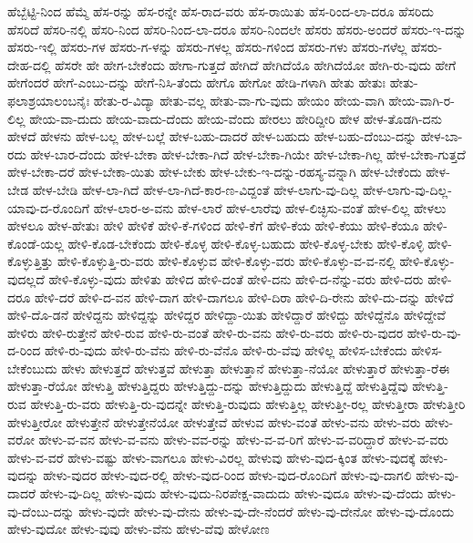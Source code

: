 {ಹೆಬ್ಬೆಟ್ಟಿ-ನಿಂದ
ಹೆಮ್ಮೆ
ಹೆಸ-ರನ್ನು
ಹೆಸ-ರನ್ನೇ
ಹೆಸ-ರಾದ-ವರು
ಹೆಸ-ರಾಯಿತು
ಹೆಸ-ರಿಂದ-ಲಾ-ದರೂ
ಹೆಸರಿದು
ಹೆಸರಿದೆ
ಹೆಸರಿ-ನಲ್ಲಿ
ಹೆಸರಿ-ನಿಂದ
ಹೆಸರಿ-ನಿಂದ-ಲಾ-ದರೂ
ಹೆಸರಿ-ನಿಂದಲೇ
ಹೆಸರು
ಹೆಸರು-ಅಂದರೆ
ಹೆಸರು-ಇ-ದನ್ನು
ಹೆಸರು-ಇಲ್ಲಿ
ಹೆಸರು-ಗಳ
ಹೆಸರು-ಗ-ಳನ್ನು
ಹೆಸರು-ಗಳಲ್ಲ
ಹೆಸರು-ಗಳಿಂದ
ಹೆಸರು-ಗಳು
ಹೆಸರು-ಗಳೆಲ್ಲ
ಹೆಸರು-ದೇಹ-ದಲ್ಲಿ
ಹೆಸರೇ
ಹೇ
ಹೇಗ-ಬೇಕೆಂದು
ಹೇಗಾ-ಗುತ್ತದೆ
ಹೇಗಿದೆ
ಹೇಗಿದೆಯೊ
ಹೇಗಿದೆಯೋ
ಹೇಗಿ-ರು-ವುದು
ಹೇಗೆ
ಹೇಗೆಂದರೆ
ಹೇಗೆ-ಎಂಬು-ದನ್ನು
ಹೇಗೆ-ನಿಸಿ-ತೆಂದು
ಹೇಗೊ
ಹೇಗೋ
ಹೇಡಿ-ಗಳಾಗಿ
ಹೇತು
ಹೇತುಃ
ಹೇತು-ಫಲಾಶ್ರಯಾಲಂಬನೈಃ
ಹೇತು-ರ-ವಿದ್ಯಾ
ಹೇತು-ವಲ್ಲ
ಹೇತು-ವಾ-ಗು-ವುದು
ಹೇಯಂ
ಹೇಯ-ವಾಗಿ
ಹೇಯ-ವಾಗಿ-ರ-ಲಿಲ್ಲ
ಹೇಯ-ವಾ-ದುದು
ಹೇಯ-ವಾದು-ದೆಂದು
ಹೇಯ-ವೆಂದು
ಹೇರಲು
ಹೇರಿದ್ದೀರಿ
ಹೇಳ
ಹೇಳ-ತೊಡಗಿ-ದನು
ಹೇಳದೆ
ಹೇಳನು
ಹೇಳ-ಬಲ್ಲ
ಹೇಳ-ಬಲ್ಲೆ
ಹೇಳ-ಬಹು-ದಾದರೆ
ಹೇಳ-ಬಹುದು
ಹೇಳ-ಬಹು-ದೆಂಬು-ದನ್ನು
ಹೇಳ-ಬಾ-ರದು
ಹೇಳ-ಬಾರ-ದೆಂದು
ಹೇಳ-ಬೇಕಾ
ಹೇಳ-ಬೇಕಾ-ಗಿದೆ
ಹೇಳ-ಬೇಕಾ-ಗಿಯೇ
ಹೇಳ-ಬೇಕಾ-ಗಿಲ್ಲ
ಹೇಳ-ಬೇಕಾ-ಗುತ್ತದೆ
ಹೇಳ-ಬೇಕಾ-ದರೆ
ಹೇಳ-ಬೇಕಾ-ಯಿತು
ಹೇಳ-ಬೇಕು
ಹೇಳ-ಬೇಕು-ಇ-ದನ್ನು-ರಹಸ್ಯ-ವನ್ನಾಗಿ
ಹೇಳ-ಬೇಕೆಂದು
ಹೇಳ-ಬೇಡ
ಹೇಳ-ಬೇಡಿ
ಹೇಳ-ಲಾ-ಗಿದೆ
ಹೇಳ-ಲಾ-ಗಿದೆ-ಕಾರ-ಣ-ವಿದ್ದಂತೆ
ಹೇಳ-ಲಾಗು-ವು-ದಿಲ್ಲ
ಹೇಳ-ಲಾಗು-ವು-ದಿಲ್ಲ-ಯಾವು-ದ-ರೊಂದಿಗೆ
ಹೇಳ-ಲಾರ-ಅ-ವನು
ಹೇಳ-ಲಾರೆ
ಹೇಳ-ಲಾರೆವು
ಹೇಳ-ಲಿಚ್ಛಿಸು-ವಂತೆ
ಹೇಳ-ಲಿಲ್ಲ
ಹೇಳಲು
ಹೇಳಲೂ
ಹೇಳ-ಹೇತುಃ
ಹೇಳಿ
ಹೇಳಿಕೆ
ಹೇಳಿ-ಕೆ-ಗಳಿಂದ
ಹೇಳಿ-ಕೆಗೆ
ಹೇಳಿ-ಕೆಯ
ಹೇಳಿ-ಕೆಯು
ಹೇಳಿ-ಕೆಯೂ
ಹೇಳಿ-ಕೊಂಡೆ-ಯಲ್ಲ
ಹೇಳಿ-ಕೊಡ-ಬೇಕೆಂದು
ಹೇಳಿ-ಕೊಳ್ಳ
ಹೇಳಿ-ಕೊಳ್ಳ-ಬಹುದು
ಹೇಳಿ-ಕೊಳ್ಳ-ಬೇಕು
ಹೇಳಿ-ಕೊಳ್ಳಿ
ಹೇಳಿ-ಕೊಳ್ಳುತ್ತಿತ್ತು
ಹೇಳಿ-ಕೊಳ್ಳುತ್ತಿ-ರು-ವರು
ಹೇಳಿ-ಕೊಳ್ಳುವ
ಹೇಳಿ-ಕೊಳ್ಳು-ವರು
ಹೇಳಿ-ಕೊಳ್ಳು-ವ-ವ-ನಲ್ಲಿ
ಹೇಳಿ-ಕೊಳ್ಳು-ವುದಲ್ಲದೆ
ಹೇಳಿ-ಕೊಳ್ಳು-ವುದು
ಹೇಳಿತು
ಹೇಳಿದ
ಹೇಳಿ-ದಂತೆ
ಹೇಳಿ-ದನು
ಹೇಳಿ-ದ-ನೆನ್ನು-ವರು
ಹೇಳಿ-ದರು
ಹೇಳಿ-ದರೂ
ಹೇಳಿ-ದರೆ
ಹೇಳಿ-ದ-ವನ
ಹೇಳಿ-ದಾಗ
ಹೇಳಿ-ದಾಗಲೂ
ಹೇಳಿ-ದಿರಾ
ಹೇಳಿ-ದಿ-ರೇನು
ಹೇಳಿ-ದು-ದನ್ನು
ಹೇಳಿದೆ
ಹೇಳಿ-ದೊ-ಡನೆ
ಹೇಳಿದ್ದನು
ಹೇಳಿದ್ದನ್ನು
ಹೇಳಿದ್ದರ
ಹೇಳಿದ್ದಾ-ಯಿತು
ಹೇಳಿದ್ದಾರೆ
ಹೇಳಿದ್ದು
ಹೇಳಿದ್ದೆನೊ
ಹೇಳಿದ್ದೇವೆ
ಹೇಳಿರು
ಹೇಳಿ-ರುತ್ತೇನೆ
ಹೇಳಿ-ರುವ
ಹೇಳಿ-ರು-ವಂತೆ
ಹೇಳಿ-ರು-ವನು
ಹೇಳಿ-ರು-ವರು
ಹೇಳಿ-ರು-ವುದರ
ಹೇಳಿ-ರು-ವು-ದ-ರಿಂದ
ಹೇಳಿ-ರು-ವುದು
ಹೇಳಿ-ರು-ವೆನು
ಹೇಳಿ-ರು-ವೆನೊ
ಹೇಳಿ-ರು-ವೆವು
ಹೇಳಿಲ್ಲ
ಹೇಳಿಸ-ಬೇಕೆಂದು
ಹೇಳಿಸ-ಬೇಕೆಂಬುದು
ಹೇಳು
ಹೇಳುತ್ತದೆ
ಹೇಳುತ್ತವೆ
ಹೇಳುತ್ತಾ
ಹೇಳುತ್ತಾನೆ
ಹೇಳುತ್ತಾ-ನೆಯೋ
ಹೇಳುತ್ತಾರೆ
ಹೇಳುತ್ತಾ-ರೆಈ
ಹೇಳುತ್ತಾ-ರೆಯೋ
ಹೇಳುತ್ತಿ
ಹೇಳುತ್ತಿದ್ದರು
ಹೇಳುತ್ತಿದ್ದು-ದನ್ನು
ಹೇಳುತ್ತಿದ್ದುದು
ಹೇಳುತ್ತಿದ್ದೆ
ಹೇಳುತ್ತಿದ್ದೆವು
ಹೇಳುತ್ತಿ-ರುವ
ಹೇಳುತ್ತಿ-ರು-ವರು
ಹೇಳುತ್ತಿ-ರು-ವುದನ್ನೇ
ಹೇಳುತ್ತಿ-ರುವುದು
ಹೇಳುತ್ತಿಲ್ಲ
ಹೇಳುತ್ತೀ-ರಲ್ಲ
ಹೇಳುತ್ತೀರಾ
ಹೇಳುತ್ತೀರಿ
ಹೇಳುತ್ತೀರೋ
ಹೇಳುತ್ತೇನೆ
ಹೇಳುತ್ತೇನೆಯೋ
ಹೇಳುತ್ತೇವೆ
ಹೇಳುವ
ಹೇಳು-ವಂತೆ
ಹೇಳು-ವನು
ಹೇಳು-ವರು
ಹೇಳು-ವರೋ
ಹೇಳು-ವ-ವನ
ಹೇಳು-ವ-ವನು
ಹೇಳು-ವವ-ರನ್ನು
ಹೇಳು-ವ-ವ-ರಿಗೆ
ಹೇಳು-ವ-ವರಿದ್ದಾರೆ
ಹೇಳು-ವ-ವರು
ಹೇಳು-ವ-ವರೆ
ಹೇಳು-ವಷ್ಟು
ಹೇಳು-ವಾಗಲೂ
ಹೇಳು-ವಿರಲ್ಲ
ಹೇಳುವು
ಹೇಳು-ವುದ-ಕ್ಕಿಂತ
ಹೇಳು-ವುದಕ್ಕೆ
ಹೇಳು-ವುದನ್ನು
ಹೇಳು-ವುದರ
ಹೇಳು-ವುದ-ರಲ್ಲಿ
ಹೇಳು-ವುದ-ರಿಂದ
ಹೇಳು-ವುದ-ರೊಂದಿಗೆ
ಹೇಳು-ವು-ದಾಗಲಿ
ಹೇಳು-ವು-ದಾದರೆ
ಹೇಳು-ವು-ದಿಲ್ಲ
ಹೇಳು-ವುದು
ಹೇಳು-ವುದು-ನಿರಪೇಕ್ಷ-ವಾದುದು
ಹೇಳು-ವುದೂ
ಹೇಳು-ವು-ದೆಂದು
ಹೇಳು-ವು-ದೆಂಬು-ದನ್ನು
ಹೇಳು-ವುದೇ
ಹೇಳು-ವು-ದೇನು
ಹೇಳು-ವು-ದೇ-ನೆಂದರೆ
ಹೇಳು-ವು-ದೇನೋ
ಹೇಳು-ವು-ದೊಂದು
ಹೇಳು-ವುದೋ
ಹೇಳು-ವುವು
ಹೇಳು-ವೆನು
ಹೇಳು-ವೆವು
ಹೇಳೋಣ
}
